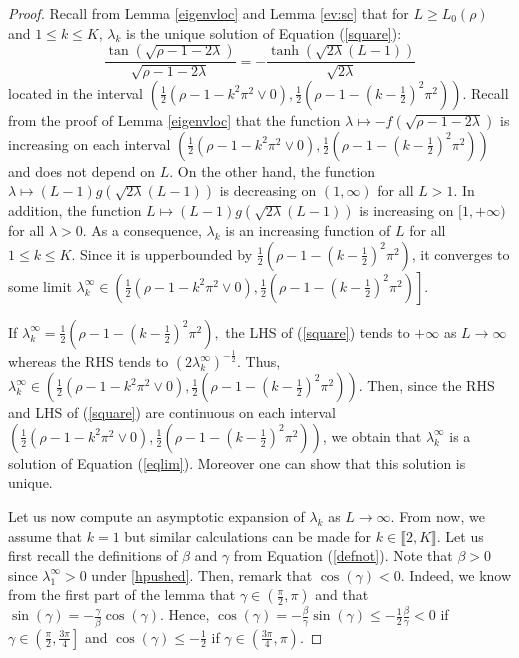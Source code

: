 \documentclass[11pt]{article}
\theoremstyle{plain}
\newcommand\linf{\lambda_1^\infty}
\begin{document}
\begin{proof}
Recall from Lemma \ref{eigenvloc} and Lemma \ref{ev:sc} that for $L\geqslant L_0(\rho)$ and $1\leqslant k\leqslant K$, $\lambda_k$ is the unique solution of Equation (\ref{square}):
\begin{equation*}
\frac{\tan(\sqrt{\rho-1-2\lambda})}{\sqrt{\rho-1-2\lambda}}=-\frac{\tanh(\sqrt{2\lambda}(L-1))}{\sqrt{2\lambda}}
\end{equation*}
located in the interval $(\frac{1}{2}(\rho-1-k^2\pi^2\vee 0),\frac{1}{2}(\rho -1- \left(k-\frac{1}{2}\right)^2\pi^2))$. 
Recall from the proof of Lemma \ref{eigenvloc} that the function $\lambda\mapsto -f(\sqrt{\rho-1-2\lambda})$ is increasing on each interval $(\frac{1}{2}(\rho-1-k^2\pi^2\vee 0),\frac{1}{2}(\rho -1- \left(k-\frac{1}{2}\right)^2\pi^2))$ and does not depend on $L$. On the other hand,  the function $\lambda\mapsto (L-1)g(\sqrt{2\lambda}(L-1))$ is decreasing on $(1,\infty)$ for all $L>1$. In addition, the function $L\mapsto (L-1)g(\sqrt{2\lambda}(L-1))$ is increasing on $[1,+\infty)$ for all $\lambda>0$. As a consequence, $\lambda_k$ is an increasing function of $L$ for all $1\leqslant k\leqslant K$. Since it is upperbounded by $\frac{1}{2}(\rho -1- \left(k-\frac{1}{2}\right)^2\pi^2)$, it converges to some limit $\lambda_k^\infty\in\left(\frac{1}{2}(\rho-1-k^2\pi^2\vee 0),\frac{1}{2}(\rho -1- \left(k-\frac{1}{2}\right)^2\pi^2)\right]$.

If $\lambda_k^\infty =\frac{1}{2}(\rho -1- \left(k-\frac{1}{2}\right)^2\pi^2),$ the LHS of (\ref{square}) tends to $+\infty$ as $L\to \infty$ whereas the RHS tends to $(2\lambda_k^\infty)^{-\frac{1}{2}}$. Thus, $\lambda_k^\infty\in\left(\frac{1}{2}(\rho-1-k^2\pi^2\vee 0),\frac{1}{2}(\rho -1- \left(k-\frac{1}{2}\right)^2\pi^2)\right).$
Then, since the RHS and LHS of (\ref{square}) are continuous on each interval $(\frac{1}{2}(\rho-1-k^2\pi^2\vee 0),\frac{1}{2}(\rho -1- \left(k-\frac{1}{2}\right)^2\pi^2))$, we obtain that $\lambda_k^\infty$ is a solution of Equation (\ref{eqlim}). Moreover one can show that this solution is unique.  

 
Let us now compute an asymptotic expansion of $\lambda_k$ as $L\to\infty$. From now, we assume that $k=1$ but similar calculations can be made for $k\in\llbracket 2,K\rrbracket.$ Let us first recall the definitions of $\beta$ and $\gamma$ from Equation (\ref{defnot}). Note that $\beta>0$ since $\linf>0$ under \eqref{hpushed}. Then, remark that $\cos(\gamma)<0$. Indeed, we know from the first part of the lemma that $\gamma \in \left(\frac{\pi}{2},\pi\right)$ and that
$\sin(\gamma)=-\frac{\gamma}{\beta}\cos(\gamma).$
Hence,  $\cos(\gamma)=-\frac{\beta}{\gamma}\sin(\gamma)\leqslant-\frac{1}{2}\frac{\beta}{\gamma}<0$ if $\gamma\in\left(\frac{\pi}{2},\frac{3\pi}{4}\right]$ and $\cos(\gamma)\leqslant -\frac{1}{2}$ if $\gamma\in\left(\frac{3\pi}{4},\pi\right)$.


\end{proof}
\end{document}
